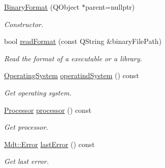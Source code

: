 \begin{DoxyCompactItemize}
\item 
\hyperlink{class_mdt_1_1_deploy_utils_1_1_binary_format_afc8824fd9d24d38d37dc11d9845d6d6c}{Binary\+Format} (Q\+Object $\ast$parent=nullptr)\hypertarget{class_mdt_1_1_deploy_utils_1_1_binary_format_afc8824fd9d24d38d37dc11d9845d6d6c}{}\label{class_mdt_1_1_deploy_utils_1_1_binary_format_afc8824fd9d24d38d37dc11d9845d6d6c}

\begin{DoxyCompactList}\small\item\em Constructor. \end{DoxyCompactList}\item 
bool \hyperlink{class_mdt_1_1_deploy_utils_1_1_binary_format_a9a0d738562a41af21b81d12199b62ea4}{read\+Format} (const Q\+String \&binary\+File\+Path)\hypertarget{class_mdt_1_1_deploy_utils_1_1_binary_format_a9a0d738562a41af21b81d12199b62ea4}{}\label{class_mdt_1_1_deploy_utils_1_1_binary_format_a9a0d738562a41af21b81d12199b62ea4}

\begin{DoxyCompactList}\small\item\em Read the format of a executable or a library. \end{DoxyCompactList}\item 
\hyperlink{namespace_mdt_1_1_deploy_utils_a998c3ae583084b7cac9e9a71b9e1ac32}{Operating\+System} \hyperlink{class_mdt_1_1_deploy_utils_1_1_binary_format_ae2dacfb9fcbca3950f42db853d38ed28}{operatind\+System} () const 
\begin{DoxyCompactList}\small\item\em Get operating system. \end{DoxyCompactList}\item 
\hyperlink{namespace_mdt_1_1_deploy_utils_aa3c03f55a06150c118902133f9a74b6f}{Processor} \hyperlink{class_mdt_1_1_deploy_utils_1_1_binary_format_a6ef69355fc5185e203e2952ebeafc62e}{processor} () const 
\begin{DoxyCompactList}\small\item\em Get processor. \end{DoxyCompactList}\item 
\hyperlink{class_mdt_1_1_error}{Mdt\+::\+Error} \hyperlink{class_mdt_1_1_deploy_utils_1_1_binary_format_a66bc1c286aa55a5634fcb89669d53496}{last\+Error} () const \hypertarget{class_mdt_1_1_deploy_utils_1_1_binary_format_a66bc1c286aa55a5634fcb89669d53496}{}\label{class_mdt_1_1_deploy_utils_1_1_binary_format_a66bc1c286aa55a5634fcb89669d53496}

\begin{DoxyCompactList}\small\item\em Get last error. \end{DoxyCompactList}\end{DoxyCompactItemize}


